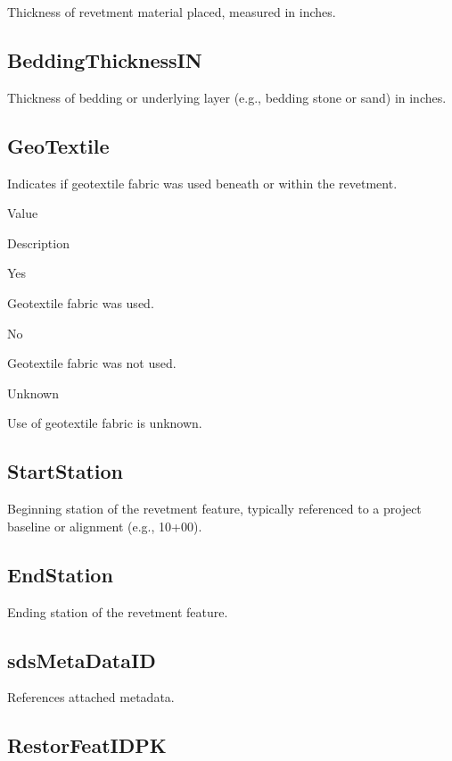 \documentclass[
  letterpaper,
  DIV=11,
  numbers=noendperiod]{scrreprt}
\begin{document}
Thickness of revetment material placed, measured in inches.

\subsection{BeddingThicknessIN}\label{beddingthicknessin}

Thickness of bedding or underlying layer (e.g., bedding stone or sand)
in inches.

\subsection{GeoTextile}\label{geotextile}

Indicates if geotextile fabric was used beneath or within the revetment.

Value

Description

Yes

Geotextile fabric was used.

No

Geotextile fabric was not used.

Unknown

Use of geotextile fabric is unknown.

\subsection{StartStation}\label{startstation-1}

Beginning station of the revetment feature, typically referenced to a
project baseline or alignment (e.g., 10+00).

\subsection{EndStation}\label{endstation-1}

Ending station of the revetment feature.

\subsection{sdsMetaDataID}\label{sdsmetadataid-11}

References attached metadata.

\subsection{RestorFeatIDPK}\label{restorfeatidpk-11}
\end{document}
